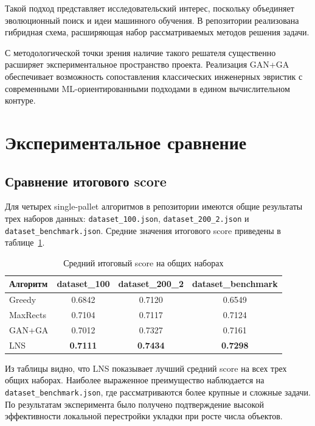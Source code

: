 \documentclass[14pt,a4paper]{extarticle}
\begin{document}
Такой подход представляет исследовательский интерес, поскольку объединяет эволюционный поиск и идеи машинного обучения. В репозитории реализована гибридная схема, расширяющая набор рассматриваемых методов решения задачи.

С методологической точки зрения наличие такого решателя существенно расширяет экспериментальное пространство проекта. Реализация GAN+GA обеспечивает возможность сопоставления классических инженерных эвристик с современными ML-ориентированными подходами в едином вычислительном контуре.

\pagebreak

\section{Экспериментальное сравнение}

\subsection{Сравнение итогового score}

Для четырех single-pallet алгоритмов в репозитории имеются общие результаты трех наборов данных: \texttt{dataset\_100.json}, \texttt{dataset\_200\_2.json} и \texttt{dataset\_benchmark.json}. Средние значения итогового score приведены в таблице~\ref{tab:score-main}.

\begin{table}[H]
\centering
\caption{Средний итоговый score на общих наборах}
\label{tab:score-main}
\begin{tabular}{lccc}
\toprule
\textbf{Алгоритм} & \textbf{dataset\_100} & \textbf{dataset\_200\_2} & \textbf{dataset\_benchmark} \\
\midrule
Greedy & 0.6842 & 0.7120 & 0.6549 \\
MaxRects & 0.7104 & 0.7117 & 0.7124 \\
GAN+GA & 0.7012 & 0.7327 & 0.7161 \\
LNS & \textbf{0.7111} & \textbf{0.7434} & \textbf{0.7298} \\
\bottomrule
\end{tabular}
\end{table}

Из таблицы видно, что LNS показывает лучший средний score на всех трех общих наборах. Наиболее выраженное преимущество наблюдается на \texttt{dataset\_benchmark.json}, где рассматриваются более крупные и сложные задачи. По результатам эксперимента было получено подтверждение высокой эффективности локальной перестройки укладки при росте числа объектов.
\end{document}
